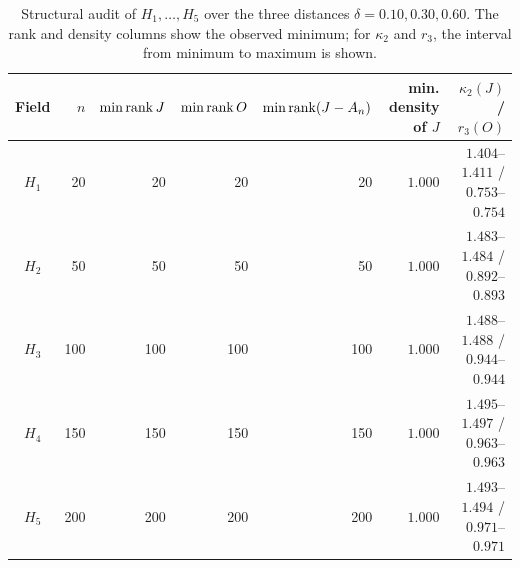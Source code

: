 \begin{table}[htbp]
\centering
\scriptsize
\caption{Structural audit of $H_1,\ldots,H_5$ over the three distances $\delta=0.10,0.30,0.60$. The rank and density columns show the observed minimum; for $\kappa_2$ and $r_3$, the interval from minimum to maximum is shown.}
\label{tab:H-structural-audit}
\begin{tabular}{crrrrrr}
\toprule
Field & $n$ & $\min\operatorname{rank} J$ & $\min\operatorname{rank} O$ & $\min\operatorname{rank}(J-A_n)$ & min. density of $J$ & $\kappa_2(J)$ / $r_3(O)$\\
\midrule
$H_1$ & 20  & 20  & 20  & 20  & $1.000$ & $1.404$--$1.411$ / $0.753$--$0.754$\\
$H_2$ & 50  & 50  & 50  & 50  & $1.000$ & $1.483$--$1.484$ / $0.892$--$0.893$\\
$H_3$ & 100 & 100 & 100 & 100 & $1.000$ & $1.488$--$1.488$ / $0.944$--$0.944$\\
$H_4$ & 150 & 150 & 150 & 150 & $1.000$ & $1.495$--$1.497$ / $0.963$--$0.963$\\
$H_5$ & 200 & 200 & 200 & 200 & $1.000$ & $1.493$--$1.494$ / $0.971$--$0.971$\\
\bottomrule
\end{tabular}
\end{table}

